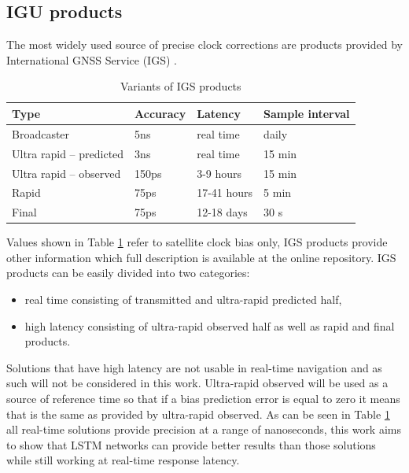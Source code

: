 \documentclass{article}
\begin{document}
\subsection{IGU products}
The most widely used source of precise clock corrections are products provided 
by International GNSS Service (IGS) \cite{Kouba2009}.
\begin{table}[htb] 
	\centering
	\caption{Variants of IGS products}
	\label{tab:igs_products}
	\begin{tabular*}{\textwidth}{*{4}{l}}
		\hline
		\hline
		Type& Accuracy& Latency& Sample interval \\
		\hline
		Broadcaster & 5ns & real time &  daily  \\
		Ultra rapid -- predicted & 3ns & real time & 15 min  \\
		Ultra rapid -- observed & 150ps & 3-9 hours & 15 min  \\
		Rapid & 75ps & 17-41 hours & 5 min \\
		Final & 75ps & 12-18 days & 30 s \\
		\hline
		\hline
	\end{tabular*}
\end{table}
Values shown in Table \ref{tab:igs_products} refer to satellite clock bias only,  IGS products
provide other information which full description is available at the online repository. 
IGS products can be easily divided into two categories:
\begin{itemize}
	\item real time consisting of transmitted and ultra-rapid predicted half,
	\item high latency consisting of ultra-rapid observed half as well as rapid and final products.
\end{itemize}
Solutions that have high latency are not usable in real-time navigation and as such will not be
considered in this work. Ultra-rapid observed will be used as a source of
reference time so that if a bias prediction error is equal to zero it means that is
the same as provided by ultra-rapid observed.
As can be seen in Table \ref{tab:igs_products} all real-time solutions provide precision 
at a range of nanoseconds, this work aims to show that LSTM networks can provide 
better results than those solutions while still working at real-time response latency.

\end{document}
